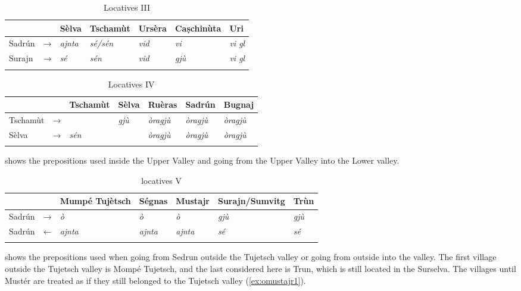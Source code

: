 \begin{table}
	\caption{Locatives III}
	\label{loc3}
	\begin{tabular}{lllllll}
		\lsptoprule
		& & Sèlva & Tschamùt & Ursèra & Caṣchinùta & Uri\\ 
		\midrule
		Sadrún  & → & \textit{ajnta} & \textit{sé/sén} & \textit{vid} & \textit{vi} & \textit{vi gl}\\
		Surajn  & → & \textit{sé} & \textit{sén}  & \textit{vid} & \textit{gjù} & \textit{vi gl}\\
		\lspbottomrule
	\end{tabular}
\end{table}

\begin{table}
	\caption{Locatives IV}
	\label{loc4}
	\begin{tabular}{lllllll}
		\lsptoprule
		& & Tschamùt & Sèlva & Ruèras & Sadrún & Bugnaj\\
		\midrule
		Tschamùt  & → & \longrule  & \textit{gjù}  & \textit{òragjù}     & \textit{òragjù}  & \textit{òragjù}\\
		Sèlva  & → & \textit{sén} & \longrule & \textit{òragjù}  & \textit{òragjù}   & \textit{òragjù} \\
		\lspbottomrule
	\end{tabular}
\end{table}

 shows the prepositions used inside the Upper Valley and going from the Upper Valley into the Lower valley.


\begin{table}
	\caption{locatives V}
	\label{loc5}
	\begin{tabular}{lllllll}
		\lsptoprule
		&       & Mumpé Tujètsch & Ségnas & Mustajr & Surajn/Sumvitg & Trùn\\ 
		\midrule
		Sadrún  & →  & \textit{ò} & \textit{ò}  &    \textit{ò} & \textit{gjù} & \textit{gjù}\\
		Sadrún & ← & \textit{ajnta} & \textit{ajnta} & \textit{ajnta} & \textit{sé}  & \textit{sé} \\
		\lspbottomrule
	\end{tabular}
\end{table}

 shows the prepositions used when going from Sedrun outside the Tujetsch valley or going from outside into the valley. The first village outside the Tujetsch valley is Mompé Tujetsch, and the last considered here is Trun, which is still located in the Surselva. The villages until Mustér  are treated as if they still belonged to the Tujetsch valley (\ref{ex:omustajr1}).


